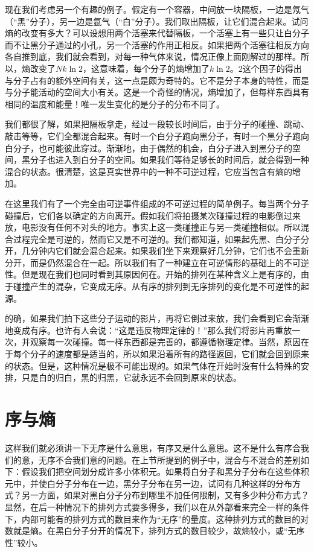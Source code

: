 现在我们考虑另一个有趣的例子。假定有一个容器，中间放一块隔板，一边是氖气（“黑”分子），另一边是氩气（“白”分子）。我们取出隔板，让它们混合起来。试问熵的改变有多大？可以设想用两个活塞来代替隔板，一个活塞上有一些只让白分子而不让黑分子通过的小孔，另一个活塞的作用正相反。如果把两个活塞往相反方向各自推到底，我们就会看到，对每一种气体来说，情况正像上面刚解过的那样。所以，熵改变了$Nk \ln 2$，这意味着，每个分子的熵增加了$k \ln 2$。2这个因子的得出与分子占有的额外空间有关，这一点是颇为奇特的。它不是分子本身的特性，而是与分子能活动的空间大小有关。这是一个奇怪的情况，熵增加了，但每样东西具有相同的温度和能量！唯一发生变化的是分子的分布不同了。

我们都很了解，如果把隔板拿走，经过一段较长时间后，由于分子的碰撞、跳动、敲击等等，它们全都混合起来。有时一个白分子跑向黑分子，有时一个黑分子跑向白分子，也可能彼此穿过。渐渐地，由于偶然的机会，白分子进入到黑分子的空间，黑分子也进入到白分子的空间。如果我们等待足够长的时间后，就会得到一种混合的状态。很清楚，这是真实世界中的一种不可逆过程，它应当包含有熵的增加。

在这里我们有了一个完全由可逆事件组成的不可逆过程的简单例子。每当两个分子碰撞后，它们各以确定的方向离开。假如我们将拍摄某次碰撞过程的电影倒过来放，电影没有任何不对头的地方。事实上这一类碰撞正与另一类碰撞相似。所以混合过程完全是可逆的，然而它又是不可逆的。我们都知道，如果起先黑、白分子分开，几分钟内它们就会混合起来。如果我们坐下来观察好几分钟，它们也不会重新分开，而是仍然混合在一起。所以我们有了一种建立在可逆情形的基础上的不可逆性。但是现在我们也同时看到其原因何在。开始的排列在某种含义上是有序的，由于碰撞产生的混杂，它变成无序。从有序的排列到无序排列的变化是不可逆性的起源。

的确，如果我们拍下这些分子运动的影片，再将它倒过来放，我们会看到它会渐渐地变成有序。也许有人会说：“这是违反物理定律的！”那么我们将影片再重放一次，并观察每一次碰撞。每一样东西都是完善的，都遵循物理定律。当然，原因在于每个分子的速度都是适当的，所以如果沿着所有的路径返回，它们就会回到原来的状态。但是，这种情况是极不可能出现的。如果气体在开始时没有什么特殊的安排，只是白的归白，黑的归黑，它就永远不会回到原来的状态。

\section{序与熵}

这样我们就必须讲一下无序是什么意思，有序又是什么意思。这不是什么有序合我们的意，无序不合我们意的问题。在上节所提到的例子中，混合与不混合的差别如下：假设我们把空间划分成许多小体积元。如果将白分子和黑分子分布在这些体积元中，并使白分子分布在一边，黑分子分布在另一边，试问有几种这样的分布方式？另一方面，如果对黑白分子分布到哪里不加任何限制，又有多少种分布方式？显然，在后一种情况下的排列方式要多得多，我们以在从外部看来完全一样的条件下，内部可能有的排列方式的数目来作为“无序”的量度。这种排列方式的数目的对数就是熵。在黑白分子分开的情况下，排列方式的数目较少，故熵较小，或“无序性”较小。

